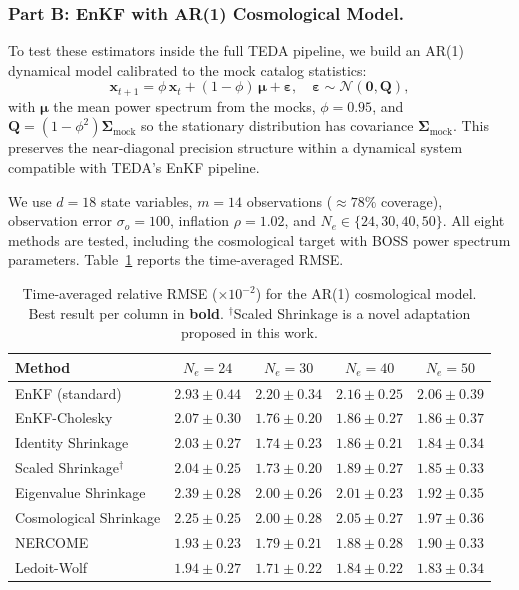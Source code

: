\subsubsection{Part B: EnKF with AR(1) Cosmological Model.}
\label{sec:cosmo_enkf}

To test these estimators inside the full TEDA pipeline, we build an AR(1) dynamical model calibrated to the mock catalog statistics:
\begin{equation}
\label{eq:ar1}
\mathbf{x}_{t+1} = \phi \, \mathbf{x}_t + (1 - \phi) \, \boldsymbol{\mu} + \boldsymbol{\varepsilon}, \quad \boldsymbol{\varepsilon} \sim \mathcal{N}(\mathbf{0}, \mathbf{Q}),
\end{equation}
with $\boldsymbol{\mu}$ the mean power spectrum from the mocks, $\phi = 0.95$, and $\mathbf{Q} = (1 - \phi^2) \boldsymbol{\Sigma}_{\text{mock}}$ so the stationary distribution has covariance $\boldsymbol{\Sigma}_{\text{mock}}$. This preserves the near-diagonal precision structure within a dynamical system compatible with TEDA's EnKF pipeline.

We use $d = 18$ state variables, $m = 14$ observations ($\approx 78\%$ coverage), observation error $\sigma_o = 100$, inflation $\rho = 1.02$, and $N_e \in \{24, 30, 40, 50\}$. All eight methods are tested, including the cosmological target with BOSS power spectrum parameters. Table~\ref{tab:cosmo_enkf} reports the time-averaged RMSE.

\begin{table}[t]
\centering
\caption{Time-averaged relative RMSE ($\times 10^{-2}$) for the AR(1) cosmological model. Best result per column in \textbf{bold}. $^\dagger$Scaled Shrinkage is a novel adaptation proposed in this work.}
\label{tab:cosmo_enkf}
\begin{tabular}{@{}lcccc@{}}
\toprule
Method & $N_e = 24$ & $N_e = 30$ & $N_e = 40$ & $N_e = 50$ \\
\midrule
EnKF (standard)          & $2.93 \pm 0.44$ & $2.20 \pm 0.34$ & $2.16 \pm 0.25$ & $2.06 \pm 0.39$ \\
EnKF-Cholesky            & $2.07 \pm 0.30$ & $1.76 \pm 0.20$ & $1.86 \pm 0.27$ & $1.86 \pm 0.37$ \\
Identity Shrinkage       & $2.03 \pm 0.27$ & $1.74 \pm 0.23$ & $1.86 \pm 0.21$ & $1.84 \pm 0.34$ \\
Scaled Shrinkage$^\dagger$ & $2.04 \pm 0.25$ & $1.73 \pm 0.20$ & $1.89 \pm 0.27$ & $1.85 \pm 0.33$ \\
Eigenvalue Shrinkage     & $2.39 \pm 0.28$ & $2.00 \pm 0.26$ & $2.01 \pm 0.23$ & $1.92 \pm 0.35$ \\
Cosmological Shrinkage   & $2.25 \pm 0.25$ & $2.00 \pm 0.28$ & $2.05 \pm 0.27$ & $1.97 \pm 0.36$ \\
NERCOME                  & $1.93 \pm 0.23$ & $1.79 \pm 0.21$ & $1.88 \pm 0.28$ & $1.90 \pm 0.33$ \\
Ledoit-Wolf              & $\mathbf{1.94 \pm 0.27}$ & $\mathbf{1.71 \pm 0.22}$ & $\mathbf{1.84 \pm 0.22}$ & $\mathbf{1.83 \pm 0.34}$ \\
\bottomrule
\end{tabular}
\end{table}


